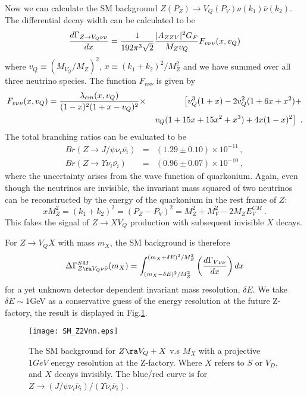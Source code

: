 \documentclass[11pt]{article}
\begin{document}
Now we can calculate the SM background $Z(P_Z)\to V_Q(P_V) \nu(k_1)\bar{\nu}(k_2)$.
The differential decay width can be calculated to be
\begin{equation}
\frac{d \Gamma_{Z \to V_Q\nu\nu}}{ d x}={1\over 192\pi^3\sqrt{2}}{|A_{ZZV}|^2 G_F\over M_Z v_Q} F_{v\nu\nu}(x,v_Q)
\end{equation}
where $v_Q\equiv (M_{V_Q}/M_Z)^2$, $x\equiv (k_1+k_2)^2/M_Z^2$ and we have summed over all three neutrino species.
The function $F_{v\nu\nu}$ is given by
\begin{eqnarray}
F_{v\nu\nu}(x,v_Q)={\lambda_{cm}(x,v_Q)\over (1-x)^2(1+x-v_Q)^2}
& \times & \left[ v_Q^3(1+x)-2v_Q^2(1+6x+x^2)+\right.\nonumber \\
&& \left. v_Q(1+15x+15x^2+x^3)+4x(1-x)^2\right]\ .
\end{eqnarray}
The total branching ratios can be evaluated to be \begin{eqnarray}
Br(Z\to J/\psi \nu_i\bar{\nu_i})&=& (1.29\pm 0.10)\times 10^{-11}\,, \\
Br(Z\to \Upsilon \nu_i\bar{\nu_i})&=& (0.96\pm 0.07)\times 10^{-10} \ ,
\end{eqnarray}
 where the uncertainty arises from the wave function of quarkonium.
Again, even though the neutrinos are invisible, the invariant mass squared of two neutrinos can be reconstructed by
the energy of the quarkonium in the rest frame of $Z$:
\begin{equation}
x M_Z^2= (k_1+k_2)^2=(P_Z-P_V)^2=M_Z^2+M_V^2-2M_Z E_V^{CM}\  .
\end{equation}
This fakes the signal of $Z\to X V_Q$ production with subsequent invisible $X$ decays.

For $Z\to V_Q X$ with mass $m_X$, the SM background is therefore
\begin{equation}
\Delta \Gamma^{SM}_{Z\ra V_Q \nu\bar{\nu}}(m_X)= \int^{(m_X+\delta E)^2/M_Z^2}_{(m_X-\delta E)^2/M_Z^2} \left(\frac{d \Gamma_{V\nu\nu}}{dx}\right) dx
\end{equation}
 for a yet unknown detector dependent invariant mass resolution, $\delta E$.
We take $\delta E\sim 1$GeV as a conservative guess of the energy resolution at the future Z-factory, the result is displayed
in Fig.\ref{fig:SMZ2Vnn}.

\begin{figure}
    \centering
    \texttt{[image: SM\_Z2Vnn.eps]}
    \caption{The SM background for $Z\ra V_Q+X$ v.s $M_X$ with a projective $1 GeV$ energy resolution at the Z-factory. Where $X$ refers to $S$ or $V_D$, and $X$ decays invisibly.
    The blue/red curve is for $Z\to (J/\psi \nu_i\bar{\nu}_i   )/(\Upsilon \nu_i\bar{\nu}_i  )$.
     }
   \label{fig:SMZ2Vnn}
\end{figure}
\end{document}
